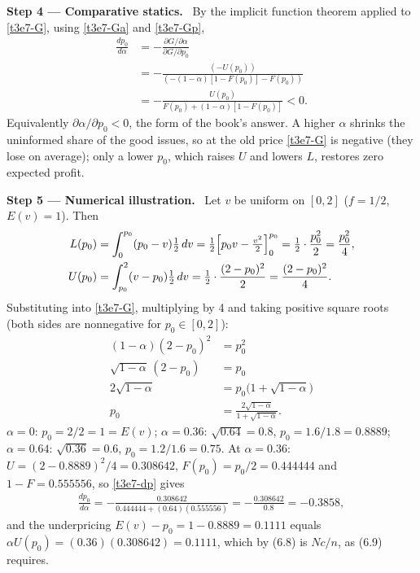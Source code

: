 \documentclass[11pt,a4paper]{article}
\newcommand{\step}[2]{\par\medskip\noindent\textbf{Step #1 --- #2.}~}
\begin{document}
\step{4}{Comparative statics} By the implicit function theorem applied to \eqref{t3e7-G}, using \eqref{t3e7-Ga} and \eqref{t3e7-Gp},
\begin{align}
  \frac{dp_0}{d\alpha} &= -\frac{\partial G/\partial\alpha}{\partial G/\partial p_0} \nonumber\\
   &= -\frac{(-U(p_0))}{(-(1-\alpha)[1-F(p_0)]-F(p_0))} \nonumber\\
   &= -\frac{U(p_0)}{F(p_0)+(1-\alpha)[1-F(p_0)]} < 0. \label{t3e7-dp}
\end{align}
Equivalently $\partial\alpha/\partial p_0<0$, the form of the book's answer. A higher $\alpha$ shrinks the uninformed share of the good issues, so at the old price \eqref{t3e7-G} is negative (they lose on average); only a lower $p_0$, which raises $U$ and lowers $L$, restores zero expected profit.

\step{5}{Numerical illustration} Let $v$ be uniform on $[0,2]$ ($f=1/2$, $E(v)=1$). Then
\begin{align}
  L(p_0) &= \int_0^{p_0}(p_0-v)\tfrac12\,dv = \tfrac12\Bigl[p_0v-\tfrac{v^2}{2}\Bigr]_0^{p_0} = \tfrac12\cdot\frac{p_0^2}{2} = \frac{p_0^2}{4}, \nonumber\\
  U(p_0) &= \int_{p_0}^{2}(v-p_0)\tfrac12\,dv = \tfrac12\cdot\frac{(2-p_0)^2}{2} = \frac{(2-p_0)^2}{4}. \nonumber
\end{align}
Substituting into \eqref{t3e7-G}, multiplying by 4 and taking positive square roots (both sides are nonnegative for $p_0\in[0,2]$):
\begin{align}
  (1-\alpha)(2-p_0)^2 &= p_0^2 \nonumber\\
  \sqrt{1-\alpha}\,(2-p_0) &= p_0 \nonumber\\
  2\sqrt{1-\alpha} &= p_0\bigl(1+\sqrt{1-\alpha}\bigr) \nonumber\\
  p_0 &= \frac{2\sqrt{1-\alpha}}{1+\sqrt{1-\alpha}}. \nonumber
\end{align}
$\alpha=0$: $p_0=2/2=1=E(v)$; $\alpha=0.36$: $\sqrt{0.64}=0.8$, $p_0=1.6/1.8=0.8889$; $\alpha=0.64$: $\sqrt{0.36}=0.6$, $p_0=1.2/1.6=0.75$. At $\alpha=0.36$: $U=(2-0.8889)^2/4=0.308642$, $F(p_0)=p_0/2=0.444444$ and $1-F=0.555556$, so \eqref{t3e7-dp} gives
\begin{align}
  \frac{dp_0}{d\alpha} = -\frac{0.308642}{0.444444+(0.64)(0.555556)} = -\frac{0.308642}{0.8} = -0.3858, \nonumber
\end{align}
and the underpricing $E(v)-p_0=1-0.8889=0.1111$ equals $\alpha U(p_0)=(0.36)(0.308642)=0.1111$, which by (6.8) is $Nc/n$, as (6.9) requires.
\end{document}
